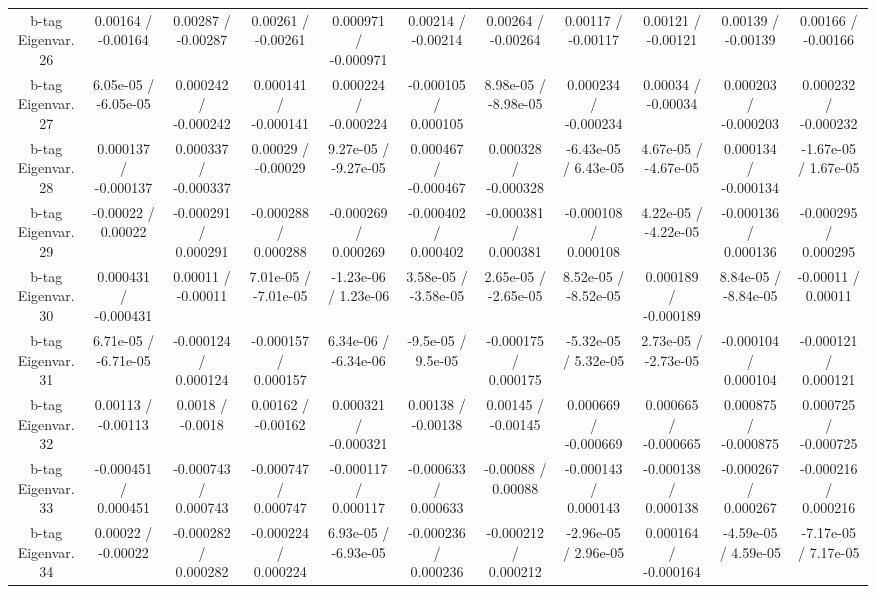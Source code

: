 \begin{table}[htbp]
\begin{center}
\begin{tabular}{|c|c|c|c|c|c|c|c|c|c|c|}
  b-tag Eigenvar. 26 & 0.00164 / -0.00164 & 0.00287 / -0.00287 & 0.00261 / -0.00261 & 0.000971 / -0.000971 & 0.00214 / -0.00214 & 0.00264 / -0.00264 & 0.00117 / -0.00117 & 0.00121 / -0.00121 & 0.00139 / -0.00139 & 0.00166 / -0.00166 \\ 
  b-tag Eigenvar. 27 & 6.05e-05 / -6.05e-05 & 0.000242 / -0.000242 & 0.000141 / -0.000141 & 0.000224 / -0.000224 & -0.000105 / 0.000105 & 8.98e-05 / -8.98e-05 & 0.000234 / -0.000234 & 0.00034 / -0.00034 & 0.000203 / -0.000203 & 0.000232 / -0.000232 \\ 
  b-tag Eigenvar. 28 & 0.000137 / -0.000137 & 0.000337 / -0.000337 & 0.00029 / -0.00029 & 9.27e-05 / -9.27e-05 & 0.000467 / -0.000467 & 0.000328 / -0.000328 & -6.43e-05 / 6.43e-05 & 4.67e-05 / -4.67e-05 & 0.000134 / -0.000134 & -1.67e-05 / 1.67e-05 \\ 
  b-tag Eigenvar. 29 & -0.00022 / 0.00022 & -0.000291 / 0.000291 & -0.000288 / 0.000288 & -0.000269 / 0.000269 & -0.000402 / 0.000402 & -0.000381 / 0.000381 & -0.000108 / 0.000108 & 4.22e-05 / -4.22e-05 & -0.000136 / 0.000136 & -0.000295 / 0.000295 \\ 
  b-tag Eigenvar. 30 & 0.000431 / -0.000431 & 0.00011 / -0.00011 & 7.01e-05 / -7.01e-05 & -1.23e-06 / 1.23e-06 & 3.58e-05 / -3.58e-05 & 2.65e-05 / -2.65e-05 & 8.52e-05 / -8.52e-05 & 0.000189 / -0.000189 & 8.84e-05 / -8.84e-05 & -0.00011 / 0.00011 \\ 
  b-tag Eigenvar. 31 & 6.71e-05 / -6.71e-05 & -0.000124 / 0.000124 & -0.000157 / 0.000157 & 6.34e-06 / -6.34e-06 & -9.5e-05 / 9.5e-05 & -0.000175 / 0.000175 & -5.32e-05 / 5.32e-05 & 2.73e-05 / -2.73e-05 & -0.000104 / 0.000104 & -0.000121 / 0.000121 \\ 
  b-tag Eigenvar. 32 & 0.00113 / -0.00113 & 0.0018 / -0.0018 & 0.00162 / -0.00162 & 0.000321 / -0.000321 & 0.00138 / -0.00138 & 0.00145 / -0.00145 & 0.000669 / -0.000669 & 0.000665 / -0.000665 & 0.000875 / -0.000875 & 0.000725 / -0.000725 \\ 
  b-tag Eigenvar. 33 & -0.000451 / 0.000451 & -0.000743 / 0.000743 & -0.000747 / 0.000747 & -0.000117 / 0.000117 & -0.000633 / 0.000633 & -0.00088 / 0.00088 & -0.000143 / 0.000143 & -0.000138 / 0.000138 & -0.000267 / 0.000267 & -0.000216 / 0.000216 \\ 
  b-tag Eigenvar. 34 & 0.00022 / -0.00022 & -0.000282 / 0.000282 & -0.000224 / 0.000224 & 6.93e-05 / -6.93e-05 & -0.000236 / 0.000236 & -0.000212 / 0.000212 & -2.96e-05 / 2.96e-05 & 0.000164 / -0.000164 & -4.59e-05 / 4.59e-05 & -7.17e-05 / 7.17e-05 \\ 

\end{tabular}
\end{center}
\end{table}
